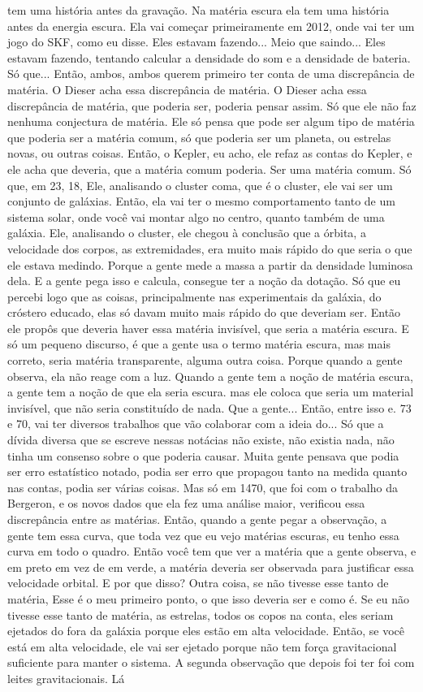 \documentclass[
	article,			%
	11pt,				%
	twoside,			%
	a4paper,			%
	english,			%
	brazil,				%
	sumario=tradicional
	]{abntex2}
\begin{document}
tem uma história antes da gravação. Na matéria escura ela tem uma história antes da energia escura. Ela vai começar primeiramente em 2012, onde vai ter um jogo do SKF, como eu disse. Eles estavam fazendo... Meio que saindo... Eles estavam fazendo, tentando calcular a densidade do som e a densidade de bateria. Só que... Então, ambos, ambos querem primeiro ter conta de uma discrepância de matéria. O Dieser acha essa discrepância de matéria. O Dieser acha essa discrepância de matéria, que poderia ser, poderia pensar assim. Só que ele não faz nenhuma conjectura de matéria. Ele só pensa que pode ser algum tipo de matéria que poderia ser a matéria comum, só que poderia ser um planeta, ou estrelas novas, ou outras coisas. Então, o Kepler, eu acho, ele refaz as contas do Kepler, e ele acha que deveria, que a matéria comum poderia. Ser uma matéria comum. Só que, em 23, 18, Ele, analisando o cluster coma, que é o cluster, ele vai ser um conjunto de galáxias. Então, ela vai ter o mesmo comportamento tanto de um sistema solar, onde você vai montar algo no centro, quanto também de uma galáxia. Ele, analisando o cluster, ele chegou à conclusão que a órbita, a velocidade dos corpos, as extremidades, era muito mais rápido do que seria o que ele estava medindo. Porque a gente mede a massa a partir da densidade luminosa dela. E a gente pega isso e calcula, consegue ter a noção da dotação. Só que eu percebi logo que as coisas, principalmente nas experimentais da galáxia, do cróstero educado, elas só davam muito mais rápido do que deveriam ser. Então ele propôs que deveria haver essa matéria invisível, que seria a matéria escura. E só um pequeno discurso, é que a gente usa o termo matéria escura, mas mais correto, seria matéria transparente, alguma outra coisa. Porque quando a gente observa, ela não reage com a luz. Quando a gente tem a noção de matéria escura, a gente tem a noção de que ela seria escura. mas ele coloca que seria um material invisível, que não seria constituído de nada. Que a gente... Então, entre isso e. 73 e 70, vai ter diversos trabalhos que vão colaborar com a ideia do... Só que a dívida diversa que se escreve nessas notácias não existe, não existia nada, não tinha um consenso sobre o que poderia causar. Muita gente pensava que podia ser erro estatístico notado, podia ser erro que propagou tanto na medida quanto nas contas, podia ser várias coisas. Mas só em 1470, que foi com o trabalho da Bergeron, e os novos dados que ela fez uma análise maior, verificou essa discrepância entre as matérias. Então, quando a gente pegar a observação, a gente tem essa curva, que toda vez que eu vejo matérias escuras, eu tenho essa curva em todo o quadro. Então você tem que ver a matéria que a gente observa, e em preto em vez de em verde, a matéria deveria ser observada para justificar essa velocidade orbital. E por que disso? Outra coisa, se não tivesse esse tanto de matéria, Esse é o meu primeiro ponto, o que isso deveria ser e como é. Se eu não tivesse esse tanto de matéria, as estrelas, todos os copos na conta, eles seriam ejetados do fora da galáxia porque eles estão em alta velocidade. Então, se você está em alta velocidade, ele vai ser ejetado porque não tem força gravitacional suficiente para manter o sistema. A segunda observação que depois foi ter foi com leites gravitacionais. Lá 
\end{document}
